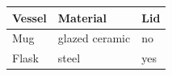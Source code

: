 \begin{tabular}{lll}
    \toprule
    Vessel & Material & Lid \\
    \midrule
    Mug & glazed ceramic & no \\
    Flask & steel & yes \\
    \bottomrule
\end{tabular}
